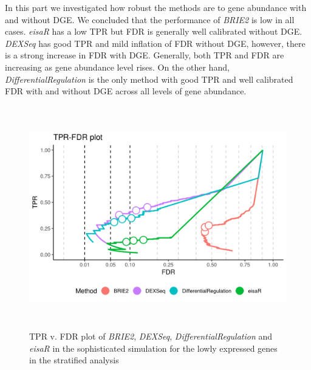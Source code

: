 In this part we investigated how robust the methods are to gene abundance with and without DGE. We concluded that the performance of \emph{BRIE2} is low in all cases. \emph{eisaR} has a low TPR but FDR is generally well calibrated without DGE. \emph{DEXSeq} has good TPR and mild inflation of FDR without DGE, however, there is a strong increase in FDR with DGE. Generally, both TPR and FDR are increasing as gene abundance level rises. On the other hand, \emph{DifferentialRegulation} is the only method with good TPR and well calibrated FDR with and without DGE across all levels of gene abundance.

\begin{figure}[!htb]
\begin{center}
\includegraphics[width=6in,height=3.8in]{../figures/simulation/minnow_simulation_low_FDR.png}
\end{center}
\caption{TPR v. FDR plot of \emph{BRIE2}, \emph{DEXSeq}, \emph{DifferentialRegulation} and \emph{eisaR} in the sophisticated simulation for the lowly expressed genes in the stratified analysis}
\label{fig:soph_sim_FDR_low}
\end{figure}

